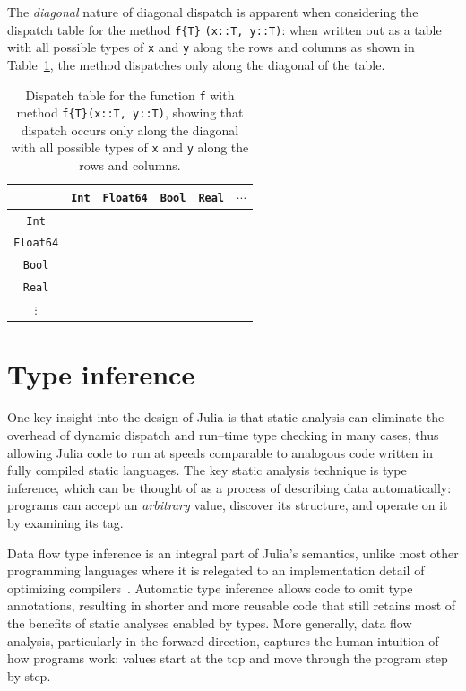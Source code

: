 \documentclass[pldi]{sigplanconf-pldi15}
\begin{document}
The \textit{diagonal} nature of diagonal dispatch is apparent when considering
the dispatch table for the method \verb|f{T}| \verb|(x::T, y::T)|: when written
out as a table with all possible types of \texttt{x} and \texttt{y} along the
rows and columns as shown in Table~\ref{tab:diagonal}, the method dispatches
only along the diagonal of the table.

\begin{table}
\begin{tabular}{c | c c c c c}
	& \verb|Int| & \verb|Float64| & \verb|Bool| & \verb|Real| & $\cdots$ \\ \hline
	\verb|Int|     & \checkmark &  &  &  & \\
	\verb|Float64| &  & \checkmark &  &  & \\
	\verb|Bool|    &  &  & \checkmark &  & \\
	\verb|Real|    &  &  &  &  & \\
	$\vdots$       &  &  &  &  &
\end{tabular}
\caption{Dispatch table for the function \texttt{f} with method
\texttt{f\{T\}(x::T, y::T)}, showing that dispatch occurs only along the
diagonal with all possible types of \texttt{x} and \texttt{y} along the rows
and columns.}
\label{tab:diagonal}
\end{table}


\section{Type inference}
\label{sec:inference}

One key insight into the design of Julia is that static analysis can eliminate
the overhead of dynamic dispatch and run--time type checking in many cases,
thus allowing Julia code to run at speeds comparable to analogous code written
in fully compiled static languages. The key static analysis technique is type
inference, which can be thought of as a process of describing data
automatically: programs can accept an \emph{arbitrary} value, discover its
structure, and operate on it by examining its tag.

Data flow type inference is an integral part of Julia's semantics, unlike most
other programming languages where it is relegated to an implementation detail
of optimizing compilers~\cite{Nielson2005,Khedker2009}. Automatic type
inference allows code to omit type annotations, resulting in shorter and more
reusable code that still retains most of the benefits of static analyses
enabled by types. More generally, data flow analysis, particularly in the
forward direction, captures the human intuition of how programs work:
values start at the top and move through the
program step by step.
\end{document}
